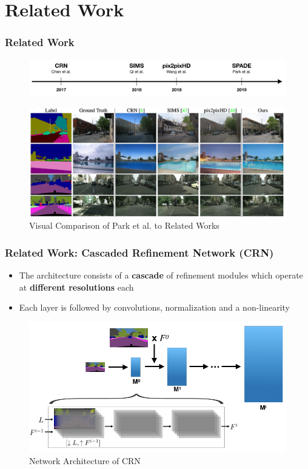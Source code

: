 \documentclass{beamer}
\begin{document}
\section{Related Work}

\begin{frame}
\frametitle{Related Work}
\centering
    \begin{figure}
        \includegraphics[scale=0.34]{figures/chronology.png} 
    \end{figure}
    \begin{figure}
        \includegraphics[width=0.9\linewidth]{figures/related_work.png} 
        \caption{Visual Comparison of Park et al. to Related Works}
    \end{figure}
\end{frame}

\begin{frame}
\frametitle{Related Work: \textbf{C}ascaded \textbf{R}efinement \textbf{N}etwork (CRN)}
    \begin{itemize}
    	\item The architecture consists of a \textbf{cascade} of refinement modules which operate at \textbf{different resolutions} each
    	\item Each layer is followed by convolutions, normalization and a non-linearity \cite{chen2017photographic}
    \end{itemize}
    \begin{figure}
        \includegraphics[scale=0.6]{figures/CRN_architecture.png}
        \caption{Network Architecture of CRN}
    \end{figure}
\end{frame}
\end{document}
